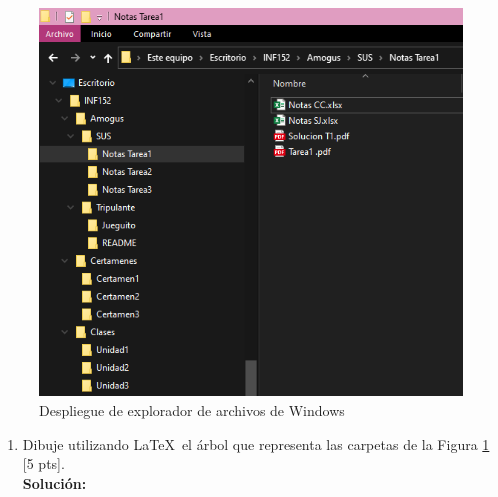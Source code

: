\documentclass[letterpaper,10pt]{article}
\begin{document}
\begin{enumerate}
\begin{center}
    \begin{figure}[H]
    \centering
        \includegraphics[scale=0.6]{inf152.png}
        \caption{Despliegue de explorador de archivos de Windows}
        \label{fig:archivos}
    \end{figure}
\end{center}

\begin{enumerate}
    \item Dibuje utilizando \LaTeX \  el árbol que representa las carpetas de la Figura \ref{fig:archivos} [5 pts].\\
    \textbf{Solución:}
    \newline
    

\end{enumerate}
\end{enumerate}
\end{document}
